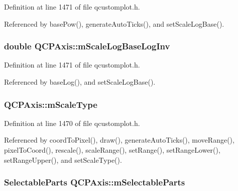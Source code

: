 Definition at line 1471 of file qcustomplot.\+h.



Referenced by base\+Pow(), generate\+Auto\+Ticks(), and set\+Scale\+Log\+Base().

\hypertarget{class_q_c_p_axis_a93e068984b475467929e7f6768754227}{}
\subsubsection[{m\+Scale\+Log\+Base\+Log\+Inv}]{\setlength{\rightskip}{0pt plus 5cm}double Q\+C\+P\+Axis\+::m\+Scale\+Log\+Base\+Log\+Inv\hspace{0.3cm}{\ttfamily [protected]}}\label{class_q_c_p_axis_a93e068984b475467929e7f6768754227}


Definition at line 1471 of file qcustomplot.\+h.



Referenced by base\+Log(), and set\+Scale\+Log\+Base().

\hypertarget{class_q_c_p_axis_ad706039549cbbbec5fcb2baf7894e04d}{}
\subsubsection[{m\+Scale\+Type}]{ Q\+C\+P\+Axis\+::m\+Scale\+Type\hspace{0.3cm}{\ttfamily [protected]}}\label{class_q_c_p_axis_ad706039549cbbbec5fcb2baf7894e04d}


Definition at line 1470 of file qcustomplot.\+h.



Referenced by coord\+To\+Pixel(), draw(), generate\+Auto\+Ticks(), move\+Range(), pixel\+To\+Coord(), rescale(), scale\+Range(), set\+Range(), set\+Range\+Lower(), set\+Range\+Upper(), and set\+Scale\+Type().

\hypertarget{class_q_c_p_axis_ab9042d8a095998f27a28b39411d8b9c3}{}
\subsubsection[{m\+Selectable\+Parts}]{\setlength{\rightskip}{0pt plus 5cm}Selectable\+Parts Q\+C\+P\+Axis\+::m\+Selectable\+Parts\hspace{0.3cm}{\ttfamily [protected]}}\label{class_q_c_p_axis_ab9042d8a095998f27a28b39411d8b9c3}


